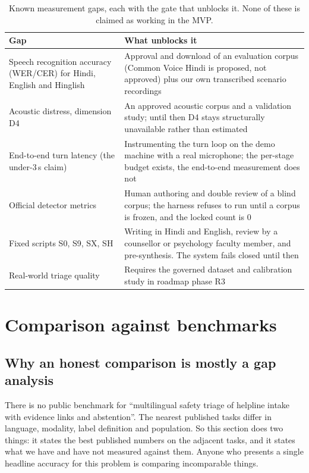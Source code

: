 \documentclass[11pt,a4paper]{article}
\begin{document}
\begin{table}[!htbp]
\centering\small
\caption{Known measurement gaps, each with the gate that unblocks it. None of these is claimed as
working in the MVP.}
\label{tab:gaps}
\begin{tabularx}{\linewidth}{@{}>{\raggedright\arraybackslash}p{4.4cm}X@{}}
\toprule
Gap & What unblocks it \\
\midrule
Speech recognition accuracy (WER/CER) for Hindi, English and Hinglish & Approval and download of an
evaluation corpus (Common Voice Hindi is proposed, not approved) plus our own transcribed scenario
recordings \\
Acoustic distress, dimension D4 & An approved acoustic corpus and a validation study; until then D4
stays structurally unavailable rather than estimated \\
End-to-end turn latency (the under-3\,s claim) & Instrumenting the turn loop on the demo machine
with a real microphone; the per-stage budget exists, the end-to-end measurement does not \\
Official detector metrics & Human authoring and double review of a blind corpus; the harness refuses
to run until a corpus is frozen, and the locked count is 0 \\
Fixed scripts S0, S9, SX, SH & Writing in Hindi and English, review by a counsellor or psychology
faculty member, and pre-synthesis. The system fails closed until then \\
Real-world triage quality & Requires the governed dataset and calibration study in roadmap phase R3 \\
\bottomrule
\end{tabularx}
\end{table}

\section{Comparison against benchmarks}
\label{sec:bench}

\subsection{Why an honest comparison is mostly a gap analysis}
There is no public benchmark for ``multilingual safety triage of helpline intake with evidence links
and abstention''. The nearest published tasks differ in language, modality, label definition and
population. So this section does two things: it states the best published numbers on the adjacent
tasks, and it states what we have and have not measured against them. Anyone who presents a single
headline accuracy for this problem is comparing incomparable things.
\end{document}
